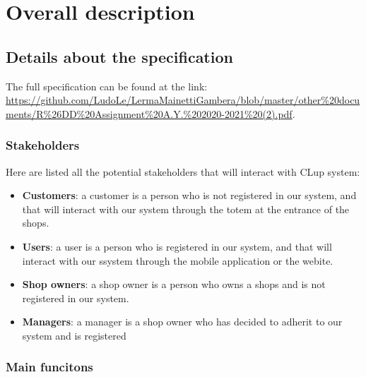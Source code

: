 \section{Overall description}
\label{sect:overalldescription}



\subsection{Details about the specification}
\label{subsect:furtherdetailsaboutspecification}

The full specification can be found at the link: \url{https://github.com/LudoLe/LermaMainettiGambera/blob/master/other%20documents/R%26DD%20Assignment%20A.Y.%202020-2021%20(2).pdf}.
\label{specification}

\subsubsection{Stakeholders}
\label{subsubsect:stakeholders}

Here are listed all the potential stakeholders that will interact with CLup system:
\begin{itemize}[topsep=0pt]
    \item \textbf{Customers}: a customer is a person who is not registered in our system, and that will interact with our system through the totem at the entrance of the shops.
    \item \textbf{Users}: a user is a person who is registered in our system, and that will interact with our ssystem through the mobile application or the webite.
    \item \textbf{Shop owners}: a shop owner is a person who owns a shops and is not registered in our system.
    \item \textbf{Managers}: a manager is a shop owner who has decided to adherit to our system and is registered
\end{itemize}

\subsubsection{Main funcitons}
\label{subsect:mainfunctions}

